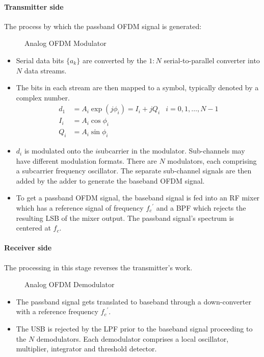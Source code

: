 \paragraph{Transmitter side} The process by which the passband OFDM signal is generated:
\begin{figure}[!h]
	\centering
	\resizebox{\textwidth}{!}{
		
	}
	\caption{Analog OFDM Modulator}
\end{figure}
\begin{itemize}
	\item Serial data bits \(\{a_k\}\) are converted by the \(1:N\) serial-to-parallel converter into \(N\) data streams.
	\item The bits in each stream are then mapped to a symbol, typically denoted by a complex number.
		\begin{align*}
			d_1 &= A_i \exp (j\phi_i) = I_i + jQ_i & i = 0,1,\ldots, N-1 \\
			I_i &= A_i \cos \phi_i \\
			Q_i &= A_i \sin \phi_i
		\end{align*}
		\begin{mathDef}
		\end{mathDef}
	\item \(d_i\) is modulated onto the \(i\)\nth subcarrier in the modulator. Sub-channels may have different modulation formats. There are \(N\) modulators, each comprising a subcarrier frequency oscillator. The separate sub-channel signals are then added by the adder to generate the baseband OFDM signal.
	\item To get a passband OFDM signal, the baseband signal is fed into an RF mixer which has a reference signal of frequency \({f_c}^\prime\) and a \gls{BPF} which rejects the resulting \gls{LSB} of the mixer output. The passband signal's spectrum is centered at \(f_c\).
\end{itemize}

\paragraph{Receiver side} The processing in this stage reverses the transmitter's work\cite{ofdm_intro}.
\begin{figure}[!h]
	\centering
	\resizebox{\textwidth}{!}{
		
	}
	\caption{Analog OFDM Demodulator}
\end{figure}
\begin{itemize}
	\item The passband signal gets translated to baseband through a down-converter with a reference frequency \({f_c}^\prime\).
	\item The \gls{USB} is rejected by the \gls{LPF} prior to the baseband signal proceeding to the \(N\) demodulators. Each demodulator comprises a local oscillator, multiplier, integrator and threshold detector.
\end{itemize}


